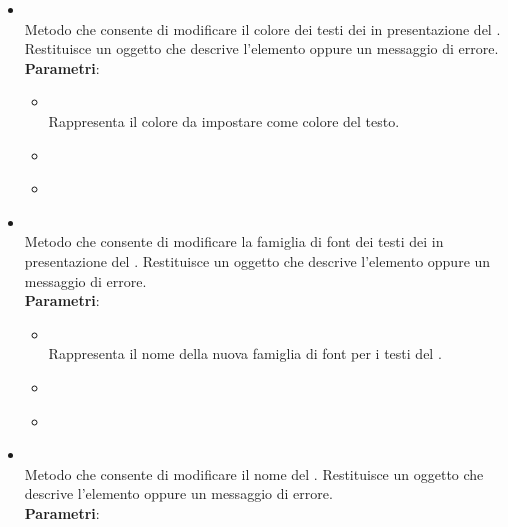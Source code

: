 \begin{itemize}
\begin{itemize}
\item {}
\\ Metodo che consente di modificare il colore dei testi dei  in presentazione del . Restituisce un oggetto  che descrive l’elemento oppure un messaggio di errore.
\\ \textbf{Parametri}:
\begin{itemize}
\item {}
\\ Rappresenta il colore da impostare come colore del testo.
\item {}
\\ \dpCallback
\item {}
\\ \dpErrBack
\end{itemize}
\item {}
\\ Metodo che consente di modificare la famiglia di font dei testi dei  in presentazione del . Restituisce un oggetto  che descrive l’elemento oppure un messaggio di errore.
\\ \textbf{Parametri}:
\begin{itemize}
\item {}
\\ Rappresenta il nome della nuova famiglia di font per i testi del .
\item {}
\\ \dpCallback
\item {}
\\ \dpErrBack
\end{itemize}
\item {}
\\ Metodo che consente di modificare il nome del . Restituisce un oggetto  che descrive l’elemento oppure un messaggio di errore.
\\ \textbf{Parametri}:
\begin{itemize}

\end{itemize}
\end{itemize}
\end{itemize}
